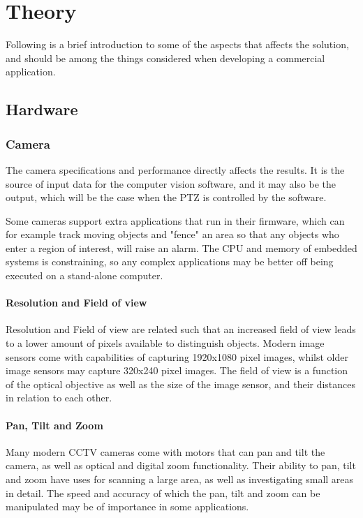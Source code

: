 \chapter{Theory}
\label{ch:chapter2}
Following is a brief introduction to some of the aspects that affects the solution, and should be among the things considered when developing a commercial application.
\section{Hardware}
\subsection{Camera}
The camera specifications and performance directly affects the results. It is the source of input data for the computer vision software, and it may also be the output, which will be the case when the PTZ is controlled by the software.

Some cameras support extra applications that run in their firmware, which can for example track moving objects and "fence" an area so that any objects who enter a region of interest, will raise an alarm.
The CPU and memory of embedded systems is constraining, so any complex applications may be better off being executed on a stand-alone computer.

\subsubsection{Resolution and Field of view}
Resolution and Field of view are related such that an increased field of view leads to a lower amount of pixels available to distinguish objects. Modern image sensors come with capabilities of capturing 1920x1080 pixel images, whilst older image sensors may capture 320x240 pixel images.
The field of view is a function of the optical objective as well as the size of the image sensor, and their distances in relation to each other.

\subsubsection{Pan, Tilt and Zoom}
Many modern CCTV cameras come with motors that can pan and tilt the camera, as well as optical and digital zoom functionality. Their ability to pan, tilt and zoom have uses for scanning a large area, as well as investigating small areas in detail.
The speed and accuracy of which the pan, tilt and zoom can be manipulated may be of importance in some applications.

